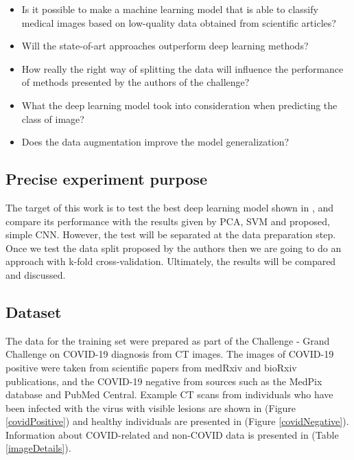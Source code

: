 \documentclass[runningheads]{llncs}
\begin{document}
\begin{itemize}
  \item Is it possible to make a machine learning model that is able to classify medical images based on low-quality data obtained from scientific articles?
  \item Will the state-of-art approaches outperform deep learning methods?
  \item How really the right way of splitting the data will influence the performance of methods presented by the authors of the challenge?
  \item What the deep learning model took into consideration when predicting the class of image?
  \item Does the data augmentation improve the model generalization?
\end{itemize}

\subsection{Precise experiment purpose}

The target of this work is to test the best deep learning model shown in \cite{he2020sample}, and compare its performance with the results given by PCA, SVM and proposed, simple CNN. However, the test will be separated at the data preparation step. Once we test the data split proposed by the authors then we are going to do an approach with k-fold cross-validation. Ultimately, the results will be compared and discussed.

\subsection{Dataset}

The data for the training set were prepared as part of the Challenge - Grand Challenge on COVID-19 diagnosis from CT images. The images of COVID-19 positive were taken from scientific papers from medRxiv and bioRxiv publications, and the COVID-19 negative from sources such as the MedPix database and PubMed Central. Example CT scans from individuals who have been infected with the virus with visible lesions are shown in (Figure \ref{covidPositive}) and healthy individuals are presented in (Figure \ref{covidNegative}). Information about COVID-related and non-COVID data is presented in (Table \ref{imageDetails}).
\newline
\end{document}
